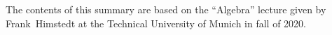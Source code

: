 
\begin{fullwidth}
\thispagestyle{empty}
\setlength{\parindent}{0pt}

\null\vfill

\section*{}
The contents of this summary are based on the ``Algebra'' lecture given by \mbox{Frank Himstedt} at the Technical University of Munich in fall of 2020.


\end{fullwidth}
